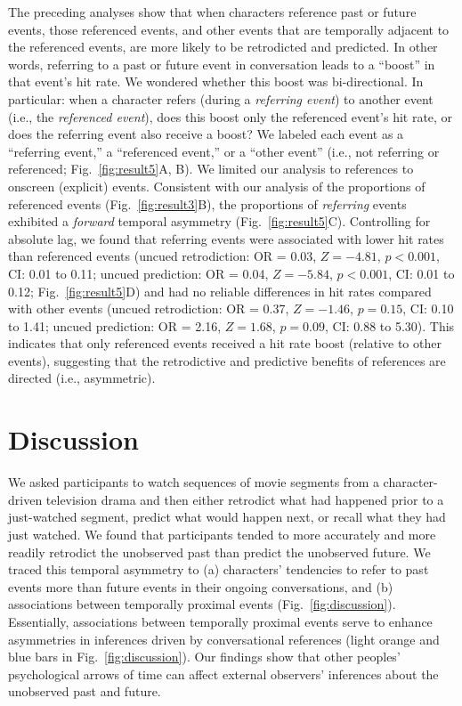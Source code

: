 \documentclass[10pt]{article}
\begin{document}
The preceding analyses show that when characters reference past or future events, those referenced events, and other events that are temporally adjacent to the referenced events, are more likely to be retrodicted and predicted.  In other words, referring to a past or future event in conversation leads to a ``boost'' in that event's hit rate.  We wondered whether this boost was bi-directional.  In particular: when a character refers (during a \textit{referring event}) to another event (i.e., the \textit{referenced event}), does this boost only the referenced event's hit rate, or does the referring event also receive a boost?  We labeled each event as a ``referring event,'' a ``referenced event,'' or a ``other event'' (i.e., not referring or referenced; Fig.~\ref{fig:result5}A, B).  We limited our analysis to references to onscreen (explicit) events. Consistent with our analysis of the proportions of referenced events (Fig.~\ref{fig:result3}B), the proportions of \textit{referring} events exhibited a \textit{forward} temporal asymmetry (Fig.~\ref{fig:result5}C).  Controlling for absolute lag, we found that referring events were associated with lower hit rates than referenced events (uncued retrodiction: OR = 0.03, $Z = -4.81$, $p < 0.001$, CI: 0.01 to 0.11; uncued prediction: OR = 0.04, $Z = -5.84$, $p < 0.001$, CI: 0.01 to 0.12; Fig.~\ref{fig:result5}D) and had no reliable differences in hit rates compared with other events (uncued retrodiction: OR = 0.37, $Z = -1.46$, $p = 0.15$, CI: 0.10 to 1.41; uncued prediction: OR = 2.16, $Z = 1.68$, $p = 0.09$, CI: 0.88 to 5.30).  This indicates that only referenced events received a hit rate boost (relative to other events), suggesting that the retrodictive and predictive benefits of references are directed (i.e., asymmetric).


\section*{Discussion}
We asked participants to watch sequences of movie segments from a character-driven television drama and then either retrodict what had happened prior to a just-watched segment, predict what would happen next, or recall what they had just watched. We found that participants tended to more accurately and more readily retrodict the unobserved past than predict the unobserved future.  We traced this temporal asymmetry to (a) characters' tendencies to refer to past events more than future events in their ongoing conversations, and (b) associations between temporally proximal events (Fig.~\ref{fig:discussion}). Essentially, associations between temporally proximal events serve to enhance asymmetries in inferences driven by conversational references (light orange and blue bars in Fig.~\ref{fig:discussion}). Our findings show that other peoples' psychological arrows of time can affect external observers' inferences about the unobserved past and future.
\end{document}
